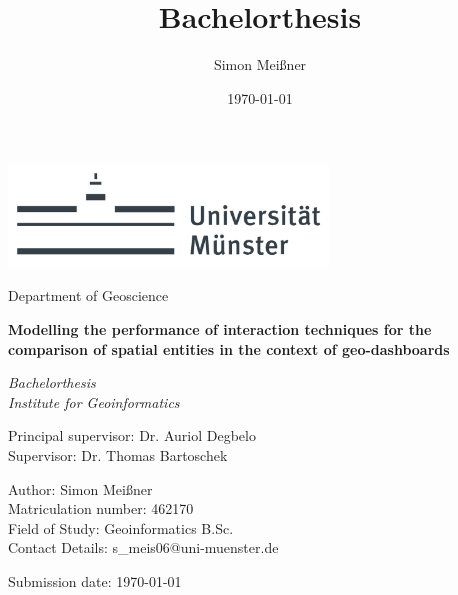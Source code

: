 \documentclass[fontsize=12pt,parskip=half,listof=totoc]{scrreprt}
\title{Bachelorthesis}
\author{Simon Meißner}
\date{\today}
\begin{document}
\begin{titlepage}
    \sffamily
    \begin{center}
        \includegraphics[width=8.5cm]{images/UniMuenster.png}
        \vspace{.5cm}
        
        {\large Department of Geoscience}
        \vspace{2cm}
        
        \begin{spacing}{1.5}
            {\Large \textbf{Modelling the performance of interaction techniques for
                            the comparison of spatial entities in the context of
                            geo-dashboards}}
            \vspace{.5cm}

            {\large \textit{Bachelorthesis\\Institute for Geoinformatics}}
        \end{spacing}
    \end{center}
    \vfill

    Principal supervisor:       \tabto{5cm} Dr. Auriol Degbelo\\
    Supervisor:      \tabto{5cm} Dr. Thomas Bartoschek

    Author:         \tabto{5cm} Simon Meißner\\
    Matriculation number:   \tabto{5cm} 462170\\
    Field of Study: \tabto{5cm} Geoinformatics B.Sc.\\
    Contact Details: \tabto{5cm} s\_meis06@uni-muenster.de


    Submission date:        \tabto{5cm} \today
\end{titlepage}


\tableofcontents
\clearpage

\pagestyle{headings}












\end{document}

